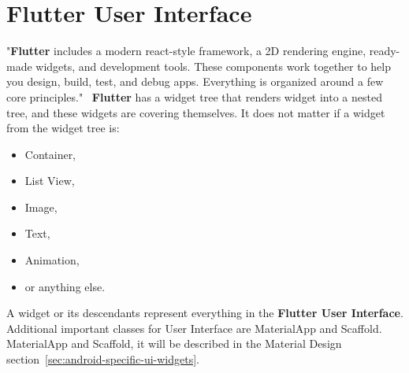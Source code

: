 \section{Flutter User Interface}\label{sec:flutter-user-interface}
"\textbf{Flutter} includes a modern react-style framework, a 2D rendering engine, ready-made widgets, and development tools.
These components work together to help you design, build, test, and debug apps.
Everything is organized around a few core principles."~\cite{flutterTechnicalOverview}
\textbf{Flutter} has a widget tree that renders widget into a nested tree, and these widgets are covering themselves.
It does not matter if a widget from the widget tree is:
\begin{itemize}
    \item Container,
    \item List View,
    \item Image,
    \item Text,
    \item Animation,
    \item or anything else.
\end{itemize}
A widget or its descendants represent everything in the \textbf{Flutter User Interface}.
Additional important classes for User Interface are MaterialApp and Scaffold.~\cite{flutterBook}
MaterialApp and Scaffold, it will be described in the Material Design section~\ref{sec:android-specific-ui-widgets}.

